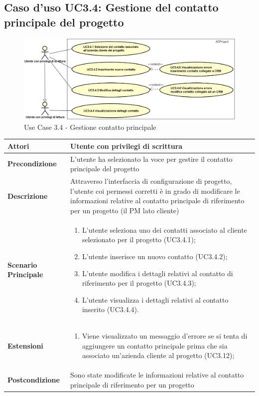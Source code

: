 	\subsection{Caso d'uso UC3.4: Gestione del contatto principale del progetto}
		\begin{figure}[H]
		\centering
		\includegraphics[scale=0.5]{images/useCase/UC3_4}
		\caption{Use Case 3.4 - Gestione contatto principale}
		\label{fig:uc3.4}
	\end{figure}
	\begin{longtable}{ | p{2.7cm} | p{12cm} |}
		\hline \textbf{Attori} & Utente con privilegi di scrittura\\
		\hline \textbf{Precondizione} &  L'utente ha selezionato la voce per gestire il contatto principale del progetto\\ 
		\hline \textbf{Descrizione} & Attraverso l’interfaccia di configurazione di progetto, l’utente coi permessi corretti è in grado di modificare le informazioni relative al contatto principale di riferimento per un progetto (il PM lato cliente)\\ 
		\hline \textbf{Scenario Principale} & \begin{enumerate}
			\itemsep-0.5em 
			\item L’utente seleziona uno dei contatti associato al cliente selezionato per il progetto  (UC3.4.1);
			\item L’utente inserisce un nuovo contatto  (UC3.4.2);
			\item L’utente modifica i dettagli relativi al contatto di riferimento per il progetto  (UC3.4.3);
			\item L’utente visualizza i dettagli relativi al contatto inserito  (UC3.4.4).
			
		\end{enumerate}
		\\ 
		\hline \textbf{Estensioni} & \begin{enumerate}
			\item Viene visualizzato un messaggio d'errore se si tenta di aggiungere un contatto principale prima che sia associato un'azienda cliente al progetto (UC3.12);
			
		\end{enumerate}
		\\ 
		\hline \textbf{Postcondizione} & Sono state modificate le informazioni relative al contatto principale di riferimento per un progetto \\ 
		\hline 
	\end{longtable}
	

